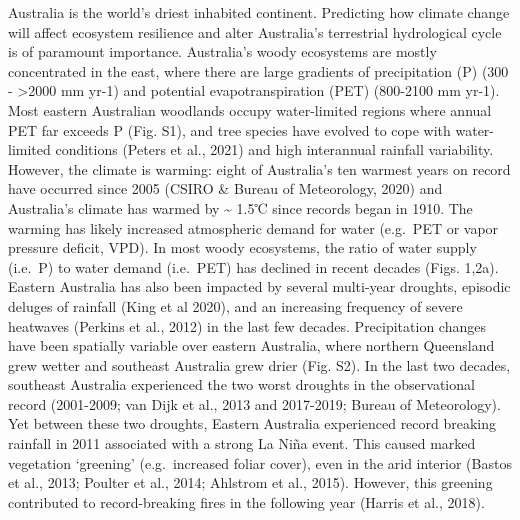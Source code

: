 \documentclass[gc, manuscript]{copernicus}
\begin{document}


\introduction[Introduction]

Australia is the world's driest inhabited continent. Predicting how
climate change will affect ecosystem resilience and alter Australia's
terrestrial hydrological cycle is of paramount importance. Australia's
woody ecosystems are mostly concentrated in the east, where there are
large gradients of precipitation (P) (300 - \textgreater2000 mm yr-1)
and potential evapotranspiration (PET) (800-2100 mm yr-1). Most eastern
Australian woodlands occupy water-limited regions where annual PET far
exceeds P (Fig. S1), and tree species have evolved to cope with
water-limited conditions (Peters et al., 2021) and high interannual
rainfall variability. However, the climate is warming: eight of
Australia's ten warmest years on record have occurred since 2005 (CSIRO
\& Bureau of Meteorology, 2020) and Australia's climate has warmed by
\textasciitilde{} 1.5℃ since records began in 1910. The warming has
likely increased atmospheric demand for water (e.g.~PET or vapor
pressure deficit, VPD). In most woody ecosystems, the ratio of water
supply (i.e.~P) to water demand (i.e.~PET) has declined in recent
decades (Figs. 1,2a). Eastern Australia has also been impacted by
several multi-year droughts, episodic deluges of rainfall (King et al
2020)\citep{kingRoleClimateVariability2020b}, and an increasing
frequency of severe heatwaves (Perkins et al., 2012) in the last few
decades. Precipitation changes have been spatially variable over eastern
Australia, where northern Queensland grew wetter and southeast Australia
grew drier (Fig. S2). In the last two decades, southeast Australia
experienced the two worst droughts in the observational record
(2001-2009; van Dijk et al., 2013 and 2017-2019; Bureau of Meteorology).
Yet between these two droughts, Eastern Australia experienced record
breaking rainfall in 2011 associated with a strong La Niña event. This
caused marked vegetation `greening' (e.g.~increased foliar cover), even
in the arid interior (Bastos et al., 2013; Poulter et al., 2014;
Ahlstrom et al., 2015). However, this greening contributed to
record-breaking fires in the following year (Harris et al., 2018).
\end{document}
